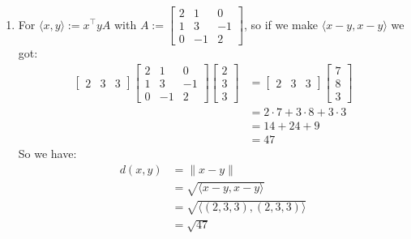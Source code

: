 \documentclass[final,expand]{problemset}
\begin{document}
{\begin{enumerate}
		\item For $\langle x, y \rangle := x^\top y A$ with $A := \begin{bmatrix}
			2 & 1 & 0\\ 1 & 3 & -1\\ 0 & -1 & 2
		\end{bmatrix}$, so if we make $\langle x-y, x-y\rangle$ we got:
		\begin{align*}
			\begin{bmatrix}
				2 & 3 & 3
			\end{bmatrix} \begin{bmatrix}
				2 & 1 & 0\\ 1 & 3 & -1\\ 0 & -1 & 2
			\end{bmatrix} \begin{bmatrix}
				2\\ 3\\ 3
			\end{bmatrix} &= \begin{bmatrix}
				2 & 3 & 3
			\end{bmatrix} \begin{bmatrix}
				7 \\ 8 \\ 3
			\end{bmatrix}\\
			&= 2 \cdot 7 + 3\cdot 8 + 3\cdot 3\\
			&= 14 + 24 + 9\\
			&= 47
		\end{align*}
		So we have:
		\begin{align*}
			d(x, y) &= \|x-y\|\\
			&= \sqrt{\langle x-y, x-y\rangle}\\
			&= \sqrt{\langle (2, 3, 3), (2, 3, 3) \rangle}\\
			&= \sqrt{47}\\
		\end{align*}
	\end{enumerate}
}
\end{document}
